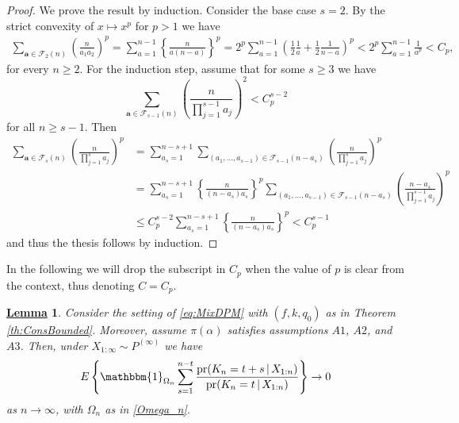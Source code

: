 \documentclass[12pt]{article}
\newtheorem{Lem}{\underline{\bf Lemma}}
\begin{document}
\begin{proof}
We prove the result by induction. Consider the base case $s=2$. 
By the strict convexity of $x\mapsto x^p$ for $p>1$ we have
\begin{align*}
\sum_{\bm{a} \in \mathcal{F}_2(n)} \left(\frac{n}{a_1 a_2}\right)^p = \sum_{a=1}^{n-1} \left\{\frac{n}{a(n-a)}\right\}^p
= 2^p \sum_{a=1}^{n-1} \left(\frac{1}{2}\frac{1}{a} +\frac{1}{2} \frac{1}{n-a}\right)^p < 2^{p} \sum_{a=1}^{n-1} \frac{1}{a^p} < C_p,
\end{align*}
for every $n\geq 2$. 
For the induction step, assume that for some $s\geq 3$ we have
$$
\sum_{\bm{a}\in \mathcal{F}_{s-1}(n)} \left(\frac{n}{\prod_{j=1}^{s-1} a_j}\right)^2 < C_p^{s-2}
$$
for all $n\geq s-1$. Then
\begin{align*}
\sum_{\bm{a} \in \mathcal{F}_s(n)} \left(\frac{n}{\prod_{j=1}^s a_j}\right)^p 
&=
\sum_{a_{s}=1}^{n-s+1} \sum_{(a_1,\dots,a_{s-1})\in \mathcal{F}_{s-1}(n-a_{s})} \left(\frac{n}{\prod_{j=1}^s a_j}\right)^p 
\\&=
\sum_{a_{s}=1}^{n-s+1} \left\{\frac{n}{(n-a_{s})a_{s}}\right\}^p \sum_{(a_1,\dots,a_{s-1})\in \mathcal{F}_{s-1}(n-a_{s})} \left(\frac{n-a_s}{\prod_{j=1}^{s-1} a_j}\right)^p\\
&\le C_p^{s-2} \sum_{a_{s}=1}^{n-s+1} \left\{\frac{n}{(n-a_{s})a_{s}}\right\}^p  < C_p^{s-1}
\end{align*}
and thus the thesis follows by induction.
\end{proof}
In the following we will drop the subscript in $C_p$ when the value of $p$ is clear from the context, thus denoting $C = C_p$.
\begin{Lem}\label{lemma:consGeneral}
Consider the setting of \eqref{eq:MixDPM} with $(f, k, q_0)$ as in Theorem \ref{th:ConsBounded}. Moreover, assume $\pi(\alpha)$ satisfies assumptions $A1$, $A2$, and $A3$. Then, under $X_{1:\infty} \sim P^{(\infty)}$ we have
\[
E\left\{\mathbbm{1}_{\Omega_n} \sum_{s = 1}^{n-t} \frac{\text{pr}(K_{n} = t+s \, | \, X_{1:n})}{\text{pr}(K_{n} = t \, | \, X_{1:n})} \right\} \to 0
\]
as $n \to \infty$, with $\Omega_n$ as in \eqref{Omega_n}.
\end{Lem}
\end{document}
